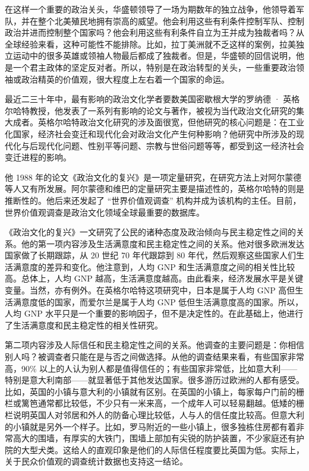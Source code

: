 在这样一个重要的政治关头，华盛顿领导了一场为期数年的独立战争，他领导着军队，并在整个北美殖民地拥有崇高的威望。他会利用这些有利条件控制军队、控制政治并进而控制整个国家吗？他会利用这些有利条件自立为王并成为独裁者吗？从全球经验来看，这种可能性不能排除。比如，拉丁美洲就不乏这样的案例，拉美独立运动中的很多英雄或领袖人物最后都成了独裁者。但是，华盛顿的回信说明，他是一个君主政体的坚定反对者。所以，特别是在政治转型的关头，一些重要政治领袖或政治精英的价值观，很大程度上左右着一个国家的命运。


最近二三十年中，最有影响的政治文化学者要数美国密歇根大学的罗纳德 · 英格尔哈特教授，他发表了一系列有影响的论文与著作，被视为当代政治文化研究的集大成者。英格尔哈特政治文化研究的涉及面很宽，但他研究的核心问题是：在工业化国家，经济社会变迁和现代化会对政治文化产生何种影响？他研究中所涉及的现代化与后现代化问题、性别平等问题、宗教与世俗问题等等，都受到这一经济社会变迁进程的影响。

他 1988 年的论文《政治文化的复兴》是一项定量研究，在研究方法上对阿尔蒙德等人又有所发展。阿尔蒙德和维巴的定量研究主要是描述性的，英格尔哈特的则是推断性的。他后来还发起了 “世界价值观调查” 机构并成为该机构的主任。目前，世界价值观调查是政治文化领域全球最重要的数据库。

《政治文化的复兴》一文研究了公民的诸种态度及政治倾向与民主稳定性之间的关系。他的第一项内容涉及生活满意度和民主稳定性之间的关系。他对很多欧洲发达国家做了长期跟踪，从 20 世纪 70 年代跟踪到 80 年代，然后观察这些国家人们生活满意度的差异和变化。他注意到，人均 GNP 和生活满意度之间的相关性比较高。总体上，人均 GNP 越高，生活满意度越高。由此看来，经济发展水平是关键变量。当然，亦有例外。在英格尔哈特这项研究中，日本是属于人均 GNP 高但生活满意度低的国家，而爱尔兰是属于人均 GNP 低但生活满意度高的国家。所以，人均 GNP 水平只是一个重要的影响因子，但不是决定性的。在此基础上，他进行了生活满意度和民主稳定性的相关性研究。

第二项内容涉及人际信任和民主稳定性之间的关系。他调查的主要问题是：你相信别人吗？被调查者只能在是与否之间做选择。从他的调查结果来看，有些国家非常高，90\% 以上的人认为别人都是值得信任的；有些国家非常低，比如意大利——特别是意大利南部——就显著低于其他发达国家。很多游历过欧洲的人都有感受。比如，英国的小镇与意大利的小镇就有区别。在英国的小镇上，每家每户门前的栅栏或篱笆通常都比较低，不少只有一米来高，一个成年人可以轻易翻越。低矮的栅栏说明英国人对邻居和外人的防备心理比较低，人与人的信任度比较高。但意大利的小镇就是另外一个样子。比如，罗马附近的一些小镇上，很多独栋住房都有着非常高大的围墙，有厚实的大铁门，围墙上部加有尖锐的防护装置，不少家庭还有护院的大型犬类。这给人的直观印象是他们的人际信任程度要比英国为低。实际上，关于民众价值观的调查统计数据也支持这一结论。

